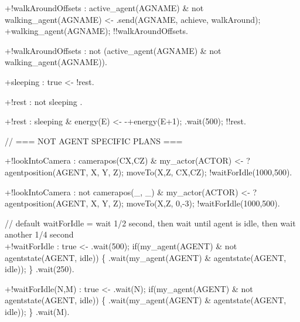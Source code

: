 \documentclass[draft,final]{vutinfth} %
\begin{document}
{+!walkAroundOffsets : active\_agent(AGNAME) \& not walking\_agent(AGNAME)
    <-  .send(AGNAME, achieve, walkAround);
        +walking\_agent(AGNAME);
        !!walkAroundOffsets.

+!walkAroundOffsets : not (active\_agent(AGNAME) \& not walking\_agent(AGNAME)).

+sleeping : true
    <-  !rest.

+!rest : not sleeping .

+!rest : sleeping \& energy(E)
    <-  -+energy(E+1);
        .wait(500);
        !!rest.

// === NOT AGENT SPECIFIC PLANS ===

+!lookIntoCamera : camerapos(CX,CZ) \& my\_actor(ACTOR)
    <-  ?agentposition(AGENT, X, Y, Z);
        moveTo(X,Z, CX,CZ);
        !waitForIdle(1000,500).

+!lookIntoCamera : not camerapos(\_, \_) \& my\_actor(ACTOR)
    <-  ?agentposition(AGENT, X, Y, Z);
        moveTo(X,Z, 0,-3);
        !waitForIdle(1000,500).

// default waitForIdle = wait 1/2 second, then wait until agent is idle, then wait another 1/4 second\\
+!waitForIdle : true
    <-  .wait(500);
        if(my\_agent(AGENT) \& not agentstate(AGENT, idle))
        \{
            .wait(my\_agent(AGENT) \& agentstate(AGENT, idle));
        \}
        .wait(250).

+!waitForIdle(N,M) : true
    <-  .wait(N);
        if(my\_agent(AGENT) \& not agentstate(AGENT, idle))
        \{
            .wait(my\_agent(AGENT) \& agentstate(AGENT, idle));
        \}
        .wait(M).
        
}


\listoffigures %



\printindex

\printglossaries



\end{document}

